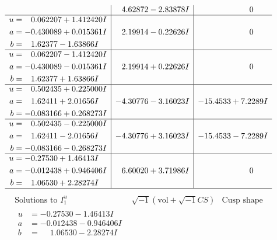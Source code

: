 \documentclass[1p]{elsarticle_modified}
\theoremstyle{definition}
\newcommand{\I}{\sqrt{-1}}
\begin{document}
$$\begin{array}{c|c|c}
 & \phantom{-}4.62872 - 2.83878 I & \phantom{-0.000000 } 0 \\ \hline\begin{aligned}
u &= \phantom{-}0.062207 + 1.412420 I \\
a &= -0.430089 + 0.015361 I \\
b &= \phantom{-}1.62377 - 1.63866 I\end{aligned}
 & \phantom{-}2.19914 - 0.22626 I & \phantom{-0.000000 } 0 \\ \hline\begin{aligned}
u &= \phantom{-}0.062207 - 1.412420 I \\
a &= -0.430089 - 0.015361 I \\
b &= \phantom{-}1.62377 + 1.63866 I\end{aligned}
 & \phantom{-}2.19914 + 0.22626 I & \phantom{-0.000000 } 0 \\ \hline\begin{aligned}
u &= \phantom{-}0.502435 + 0.225000 I \\
a &= \phantom{-}1.62411 + 2.01656 I \\
b &= -0.083166 + 0.268273 I\end{aligned}
 & -4.30776 - 3.16023 I & -15.4533 + 7.2289 I \\ \hline\begin{aligned}
u &= \phantom{-}0.502435 - 0.225000 I \\
a &= \phantom{-}1.62411 - 2.01656 I \\
b &= -0.083166 - 0.268273 I\end{aligned}
 & -4.30776 + 3.16023 I & -15.4533 - 7.2289 I \\ \hline\begin{aligned}
u &= -0.27530 + 1.46413 I \\
a &= -0.012438 + 0.946406 I \\
b &= \phantom{-}1.06530 + 2.28274 I\end{aligned}
 & \phantom{-}6.60020 + 3.71986 I & \phantom{-0.000000 } 0\\
 \hline 
 \end{array}$$\newpage$$\begin{array}{c|c|c}  
\text{Solutions to }I^u_{1}& \I (\text{vol} + \sqrt{-1}CS) & \text{Cusp shape}\\
 \hline 
\begin{aligned}
u &= -0.27530 - 1.46413 I \\
a &= -0.012438 - 0.946406 I \\
b &= \phantom{-}1.06530 - 2.28274 I\end{aligned}

\end{array}$$
\end{document}
